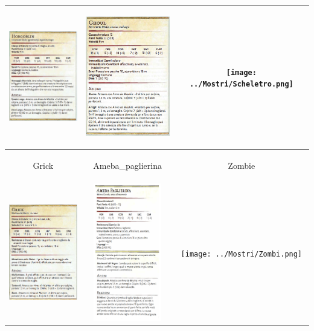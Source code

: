 \begin{tabular}{|c|c|c|}
            \includegraphics[width=4cm,height = 6cm]{../Mostri/Hobgoblin.png} &   \includegraphics[width=4cm,height = 6cm]{../Mostri/Ghoul.png} &   \texttt{[image: ../Mostri/Scheletro.png]}\\
            \hline
            \hypertarget{grick}{Grick}& \hypertarget{ameba}{Ameba\_paglierina} &\hypertarget{zombi}{Zombie}\\
            \includegraphics[width=4cm,height = 6cm]{../Mostri/Grick.png} &   \includegraphics[width=4cm,height = 6cm]{../Mostri/ameba_paglierina.png} &   \texttt{[image: ../Mostri/Zombi.png]}\\
        \end{tabular} 
   
